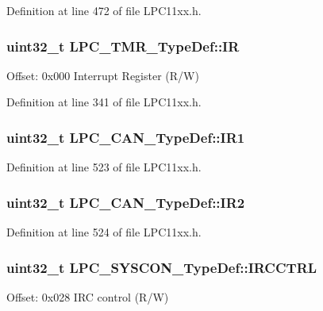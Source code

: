 Definition at line 472 of file L\+P\+C11xx.\+h.

\subsubsection[{\texorpdfstring{IR}{IR}}]{ uint32\+\_\+t L\+P\+C\+\_\+\+T\+M\+R\+\_\+\+Type\+Def\+::\+IR}\hypertarget{group___l_p_c11xx___definitions_gaf16332cbc39630294982e798e7a8d63d}{}\label{group___l_p_c11xx___definitions_gaf16332cbc39630294982e798e7a8d63d}
Offset\+: 0x000 Interrupt Register (R/W) 

Definition at line 341 of file L\+P\+C11xx.\+h.

\subsubsection[{\texorpdfstring{I\+R1}{IR1}}]{ uint32\+\_\+t L\+P\+C\+\_\+\+C\+A\+N\+\_\+\+Type\+Def\+::\+I\+R1}\hypertarget{group___l_p_c11xx___definitions_gab2c2ae4c02a7a893cef1d8afc393be1a}{}\label{group___l_p_c11xx___definitions_gab2c2ae4c02a7a893cef1d8afc393be1a}


Definition at line 523 of file L\+P\+C11xx.\+h.

\subsubsection[{\texorpdfstring{I\+R2}{IR2}}]{ uint32\+\_\+t L\+P\+C\+\_\+\+C\+A\+N\+\_\+\+Type\+Def\+::\+I\+R2}\hypertarget{group___l_p_c11xx___definitions_ga110b10d24d5c997f5929cd7364b5c526}{}\label{group___l_p_c11xx___definitions_ga110b10d24d5c997f5929cd7364b5c526}


Definition at line 524 of file L\+P\+C11xx.\+h.

\subsubsection[{\texorpdfstring{I\+R\+C\+C\+T\+RL}{IRCCTRL}}]{ uint32\+\_\+t L\+P\+C\+\_\+\+S\+Y\+S\+C\+O\+N\+\_\+\+Type\+Def\+::\+I\+R\+C\+C\+T\+RL}\hypertarget{group___l_p_c11xx___definitions_ga2b3e5d2e617c04cbf22c7af9070b86ee}{}\label{group___l_p_c11xx___definitions_ga2b3e5d2e617c04cbf22c7af9070b86ee}
Offset\+: 0x028 I\+RC control (R/W) 

